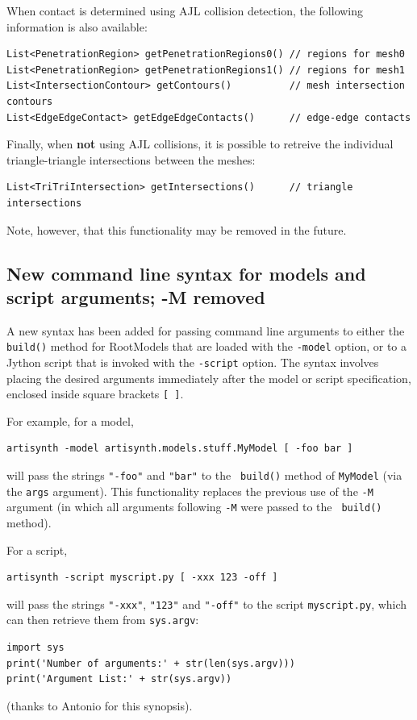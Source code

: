 \documentclass{article}
\begin{document}
When contact is determined using AJL collision detection, the
following information is also available:
%
\begin{lstlisting}[]
List<PenetrationRegion> getPenetrationRegions0() // regions for mesh0
List<PenetrationRegion> getPenetrationRegions1() // regions for mesh1
List<IntersectionContour> getContours()          // mesh intersection contours
List<EdgeEdgeContact> getEdgeEdgeContacts()      // edge-edge contacts
\end{lstlisting}
%

Finally, when {\bf not} using AJL collisions, it is possible to
retreive the individual triangle-triangle intersections between the
meshes:
%
\begin{lstlisting}[]
List<TriTriIntersection> getIntersections()      // triangle intersections 
\end{lstlisting}
%
Note, however, that this functionality may be removed in the future.

\subsection*{New command line syntax for models and script arguments; -M removed}

A new syntax has been added for passing command line arguments to
either the {\tt build()} method for RootModels that are loaded with
the {\tt -model} option, or to a Jython script that is invoked with
the {\tt -script} option. The syntax involves placing the desired
arguments immediately after the model or script specification,
enclosed inside square brackets {\tt [ ]}.

For example, for a model,
\begin{verbatim}
artisynth -model artisynth.models.stuff.MyModel [ -foo bar ]
\end{verbatim}
will pass the strings {\tt "-foo"} and {\tt "bar"} to the {\tt
build()} method of {\tt MyModel} (via the {\tt args} argument).  This
functionality replaces the previous use of the {\tt -M} argument (in
which all arguments following {\tt -M} were passed to the {\tt
build()} method).

For a script,
\begin{verbatim}
artisynth -script myscript.py [ -xxx 123 -off ]
\end{verbatim}
will pass the strings {\tt "-xxx"}, {\tt "123"} and {\tt "-off"} to
the script {\tt myscript.py}, which can then retrieve them from
{\tt sys.argv}:
%
\begin{lstlisting}[]
import sys
print('Number of arguments:' + str(len(sys.argv)))
print('Argument List:' + str(sys.argv)) 
\end{lstlisting}
%
(thanks to Antonio for this synopsis).
\end{document}
